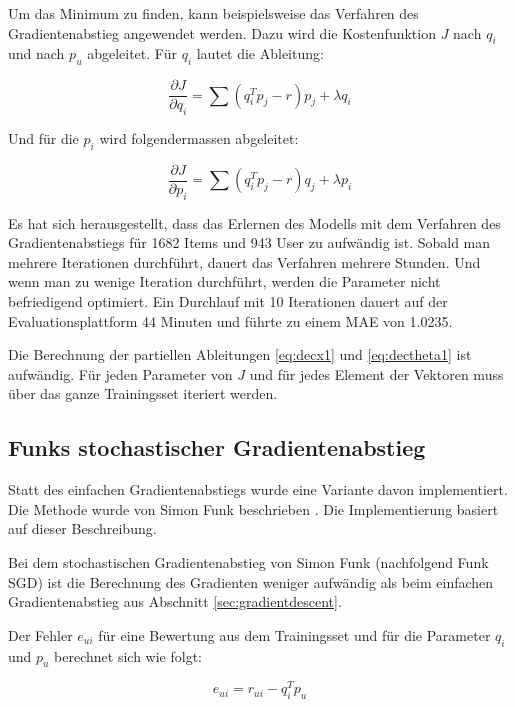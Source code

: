 \documentclass[a4paper, 12pt]{article}
\begin{document}
Um das Minimum zu finden, kann beispielsweise das Verfahren des Gradientenabstieg angewendet werden. Dazu wird die Kostenfunktion $J$ nach $q_i$ und nach $p_u$ abgeleitet. Für $q_i$ lautet die Ableitung:

\begin{equation}
  \label{eq:decx1}
  \frac{ \partial J }{ \partial q_i } = \sum (q_i^T p_j - r) p_j + \lambda q_i
\end{equation}

Und für die $p_i$ wird folgendermassen abgeleitet:

\begin{equation}
  \label{eq:dectheta1}
  \frac{ \partial J }{ \partial p_i } = \sum (q_i^T p_j - r) q_j + \lambda p_i
\end{equation}

Es hat sich herausgestellt, dass das Erlernen des Modells mit dem Verfahren des Gradientenabstiegs für 1682 Items und 943 User zu aufwändig ist. Sobald man mehrere Iterationen durchführt, dauert das Verfahren mehrere Stunden. Und wenn man zu wenige Iteration durchführt, werden die Parameter nicht befriedigend optimiert. Ein Durchlauf mit 10 Iterationen dauert auf der Evaluationsplattform 44 Minuten und führte zu einem MAE von 1.0235.

Die Berechnung der partiellen Ableitungen \ref{eq:decx1} und \ref{eq:dectheta1} ist aufwändig. Für jeden Parameter von $J$ und für jedes Element der Vektoren muss über das ganze Trainingsset iteriert werden.

\subsection{Funks stochastischer Gradientenabstieg}
\label{sec:funksvd}

Statt des einfachen Gradientenabstiegs wurde eine Variante davon implementiert. Die Methode wurde von Simon Funk beschrieben \cite{funk}. Die Implementierung basiert auf dieser Beschreibung.

Bei dem stochastischen Gradientenabstieg von Simon Funk (nachfolgend Funk SGD) ist die Berechnung des Gradienten weniger aufwändig als beim einfachen Gradientenabstieg aus Abschnitt \ref{sec:gradientdescent}.

Der Fehler $e_{ui}$ für eine Bewertung aus dem Trainingsset und für die Parameter $q_i$ und $p_u$ berechnet sich wie folgt:

\begin{equation}
  \label{eq:error1}
  e_{ui} = r_{ui} - q_i^T p_u
\end{equation}
\end{document}
